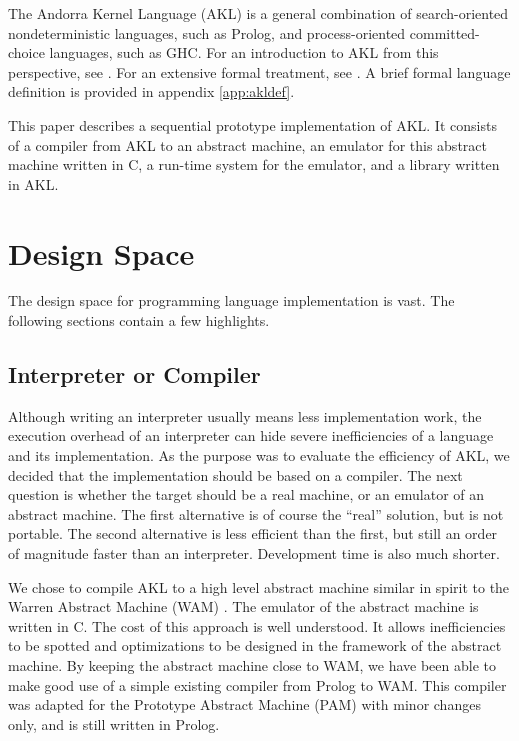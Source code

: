 The Andorra Kernel Language (AKL) is a general combination of
search-orien\-ted nondeterministic languages, such as Prolog, and
process-oriented com\-mit\-ted-choice languages, such as GHC.  For an
introduction to AKL from this perspective, see \cite{jaha91PEPMA}.
For an extensive formal treatment, see \cite{fra91PEPMA}.  A brief
formal language definition is provided in appendix \ref{app:akldef}.

This paper describes a sequential prototype implementation of AKL.  It consists
of a compiler from AKL to an abstract machine, an emulator for this
abstract machine written in C, a run-time system for the emulator, and
a library written in AKL.

\section{Design Space}

The design space for programming language implementation is vast.
The following sections contain a few highlights.

\subsection{Interpreter or Compiler}

Although writing an interpreter usually means less implementation
work, the execution overhead of an interpreter can hide severe
inefficiencies of a language and its implementation.  As the purpose
was to evaluate the efficiency of AKL, we decided that the
implementation should be based on a compiler.  The next question is
whether the target should be a real machine, or an emulator of an
abstract machine.  The first alternative is of course the ``real''
solution, but is not portable.  The second alternative is less
efficient than the first, but still an order of magnitude faster than
an interpreter.  Development time is also much shorter.

We chose to compile AKL to a high level abstract machine similar in
spirit to the Warren Abstract Machine (WAM) \cite{wam}.  The emulator
of the abstract machine is written in C.  The cost of this approach is
well understood.  It allows inefficiencies to be spotted and
optimizations to be designed in the framework of the abstract machine.
By keeping the abstract machine close to WAM, we have been able to
make good use of a simple existing compiler from Prolog to WAM.  This
compiler was adapted for the Prototype Abstract Machine (PAM) with
minor changes only, and is still written in Prolog.


